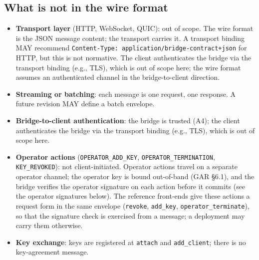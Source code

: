 \subsection{What is not in the wire format}

\begin{itemize}[leftmargin=2em]
\item \textbf{Transport layer} (HTTP, WebSocket, QUIC): out of scope.
The wire format is the JSON message content; the transport carries
it. A transport binding MAY recommend \texttt{Content-Type:
application/bridge-contract+json} for HTTP, but this is not
normative. The client authenticates the bridge via the transport
binding (e.g., TLS), which is out of scope here; the wire format
assumes an authenticated channel in the bridge-to-client direction.
\item \textbf{Streaming or batching}: each message is one request,
one response. A future revision MAY define a batch envelope.
\item \textbf{Bridge-to-client authentication}: the bridge is
trusted (A4); the client authenticates the bridge via the transport
binding (e.g., TLS), which is out of scope here.
\item \textbf{Operator actions} (\texttt{OPERATOR\_ADD\_KEY},
\texttt{OPERATOR\_TERMINATION}, \texttt{KEY\_REVOKED}):
not client-initiated. Operator actions travel on a separate operator
channel; the operator key is bound out-of-band (GAR \S 6.1), and the bridge
verifies the operator signature on each action before it commits (see the
operator signatures below). The reference front-ends give these actions
a request form in the same envelope (\texttt{revoke}, \texttt{add\_key},
\texttt{operator\_terminate}), so that the signature check is exercised
from a message; a deployment may carry them otherwise.
\item \textbf{Key exchange}: keys are registered at \texttt{attach}
and \texttt{add\_client}; there is no key-agreement message.
\end{itemize}

